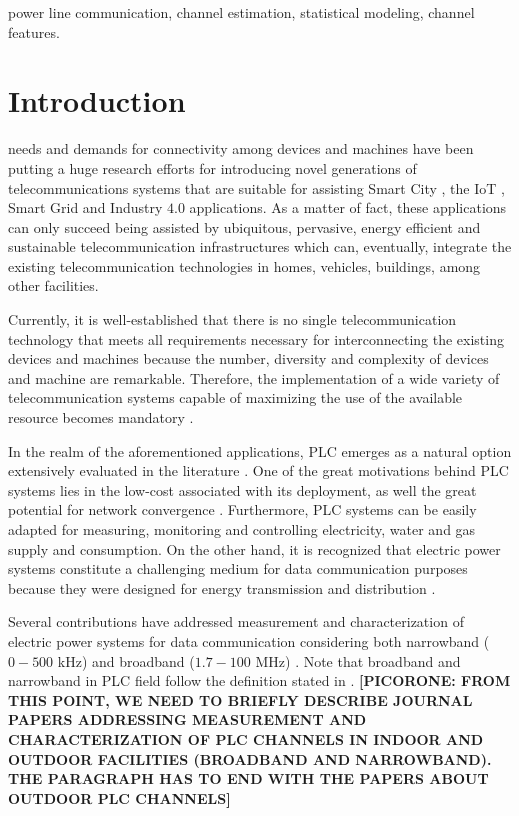 \documentclass[journal]{IEEEtran}
\begin{document}
	\begin{IEEEkeywords}
		power line communication, channel estimation, statistical modeling, channel features.
	\end{IEEEkeywords}
	\acresetall
	
	\section{Introduction}\label{sec:intro}
	 needs and demands for connectivity among devices and machines have been putting a huge research efforts for introducing novel generations of telecommunications systems that are suitable for assisting  
	Smart City \cite{Andrisano2018}, the \ac{IoT} \cite{Minoli2017}, Smart Grid \cite{Masera2018} and Industry $4.0$ \cite{Wollschlaeger2017} applications. As a matter of fact, these applications can only succeed being assisted by ubiquitous, pervasive, energy efficient and sustainable telecommunication infrastructures  which can, eventually, integrate the existing telecommunication technologies in homes, vehicles, buildings, among other  facilities. 
	
	Currently, it is well-established that there is no single telecommunication technology that meets all requirements necessary for interconnecting the existing devices and machines because the number, diversity and complexity of devices and machine are remarkable. Therefore, the implementation of a wide variety of telecommunication systems capable of maximizing the use of the available resource becomes mandatory \cite{Mehmood2017, M.B.A.Dib2018}.
	
	In the realm of the aforementioned applications, \ac{PLC} emerges as a natural option extensively  evaluated in the literature \cite{Yan2013, Han2017, Artale2018}. 
	One of the great motivations behind  \ac{PLC} systems lies in the low-cost associated with its deployment, as well the great potential for network convergence  \cite{Willie2006,M.B.A.Dib2018,Oliveira2017}. 
	Furthermore, \ac{PLC} systems can be easily adapted for  measuring, monitoring and controlling electricity, water and gas supply and consumption.
	On the other hand, it is recognized that electric power systems constitute a challenging medium for data communication purposes because they were designed for energy transmission and distribution \cite{Corripio2006,Musolino2008,Zimmermann2000}. 
	
	Several contributions have addressed measurement and characterization of electric power systems for data communication considering both narrowband ($0-500$ kHz) \cite{Liu2011,Gassara2014} and broadband ($1.7-100$ MHz) \cite{Anatory2009, Tonello2014}. Note that broadband and narrowband in \ac{PLC} field follow the definition stated in \cite{Oliveira2018}. \textbf{[PICORONE: FROM THIS POINT, WE NEED TO BRIEFLY DESCRIBE JOURNAL PAPERS ADDRESSING MEASUREMENT AND CHARACTERIZATION OF PLC CHANNELS IN INDOOR AND OUTDOOR FACILITIES (BROADBAND AND NARROWBAND). THE PARAGRAPH HAS TO END WITH THE PAPERS ABOUT OUTDOOR PLC CHANNELS]} \color{red}
	
\end{document}

